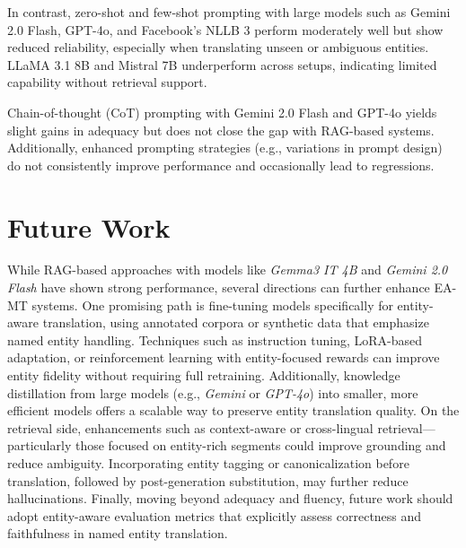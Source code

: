 \documentclass[final]{ecai}
\begin{document}
In contrast, zero-shot and few-shot prompting with large models such as Gemini 2.0 Flash, GPT-4o, 
and Facebook's NLLB 3 perform moderately well but show reduced reliability, especially when translating unseen or 
ambiguous entities. LLaMA 3.1 8B and Mistral 7B underperform across setups, indicating limited capability without retrieval 
support.

Chain-of-thought (CoT) prompting with Gemini 2.0 Flash and GPT-4o yields slight gains in adequacy but does not 
close the gap with RAG-based systems. Additionally, enhanced prompting strategies (e.g., variations in prompt design) 
do not consistently improve performance and occasionally lead to regressions.

\section{Future Work}
\label{sec:future_work}
While RAG-based approaches with models like \textit{Gemma3 IT 4B} and \textit{Gemini 2.0 Flash} have shown strong performance, 
several directions can further enhance EA-MT systems. One promising path is fine-tuning models specifically for 
entity-aware translation, using annotated corpora or synthetic data that emphasize named entity handling. 
Techniques such as instruction tuning, LoRA-based adaptation, or reinforcement learning with entity-focused rewards 
can improve entity fidelity without requiring full retraining. 
Additionally, knowledge distillation from large models (e.g., \textit{Gemini} or \textit{GPT-4o}) into smaller, 
more efficient models offers a scalable way to preserve entity translation quality. On the retrieval side,
enhancements such as context-aware or cross-lingual retrieval—particularly those focused on entity-rich segments 
could improve grounding and reduce ambiguity. Incorporating entity tagging or canonicalization before translation, 
followed by post-generation substitution, may further reduce hallucinations. 
Finally, moving beyond adequacy and fluency, future work should adopt entity-aware evaluation metrics that explicitly 
assess correctness and faithfulness in named entity translation.
    

\end{document}

